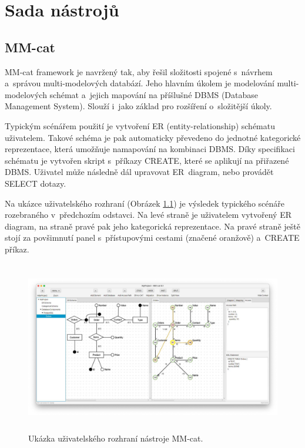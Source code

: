 \pagestyle{plain}  %

\chapter{Sada nástrojů}


\section{MM-cat}

MM-cat framework je navržený tak, aby řešil složitosti spojené s~návrhem a~správou multi-modelových databází. Jeho hlavním úkolem je modelování multi-modelových schémat a~jejich mapování na příšlušné DBMS (Database Management System). Slouží i~jako základ pro rozšíření o~složitější úkoly.

Typickým scénářem použití je vytvoření ER (entity-relationship) schématu uživatelem. Takové schéma je pak automaticky převedeno do jednotné kategorické reprezentace, která umožňuje namapování na kombinaci DBMS. Díky specifikaci schématu je vytvořen skript s~příkazy CREATE, které se aplikují na přiřazené DBMS. Uživatel může následně dál upravovat ER~diagram, nebo provádět \mbox{SELECT} dotazy.

Na ukázce uživatelského rozhraní (Obrázek \ref{obr01:mm-cat}) je výsledek typického scénáře rozebraného v~předchozím odstavci. Na levé straně je uživatelem vytvořený ER diagram, na straně pravé pak jeho kategorická reprezentace. Na pravé straně ještě stojí za povšimnutí panel s~přístupovými cestami (značené oranžově) a~CREATE příkaz.

\begin{figure}[htb]
  \centering
  \includegraphics[height=75mm]{../img/mm-cat}
  \caption{Ukázka uživatelského rozhraní nástroje MM-cat.}
  \label{obr01:mm-cat}
\end{figure}

